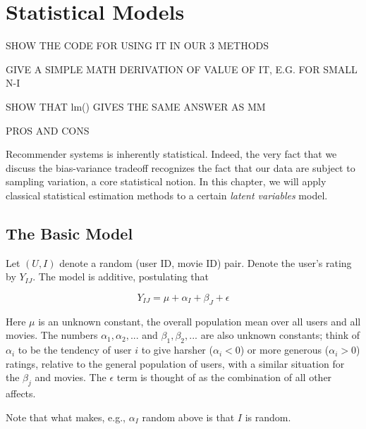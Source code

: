 \chapter{Statistical Models}  
\label{chap:mixed} 

SHOW THE CODE FOR USING IT IN OUR 3 METHODS

GIVE A SIMPLE MATH DERIVATION OF VALUE OF IT, E.G. FOR SMALL N-I

SHOW THAT lm() GIVES THE SAME ANSWER AS MM

PROS AND CONS

Recommender systems is inherently statistical.  Indeed, the very fact
that we discuss the bias-variance tradeoff recognizes the fact that our
data are subject to sampling variation, a core statistical notion.  In
this chapter, we will apply classical statistical estimation methods to
a certain \textit{latent variables} model.

\section{The Basic Model}

Let $(U,I)$ denote a random (user ID, movie ID) pair.  Denote the user's
rating by $Y_{IJ}$.  The model is additive, postulating that

\begin{equation}
Y_{IJ} = \mu + \alpha_I + \beta_J + \epsilon
\end{equation}

Here $\mu$ is an unknown constant, the overall population mean over all
users and all movies.  The numbers $\alpha_1, \alpha_2,...$ and
$\beta_1, \beta_2,...$ are also unknown constants; think of $\alpha_i$
to be the tendency of user $i$ to give harsher ($\alpha_i < 0$) or more
generous ($\alpha_i > 0$) ratings, relative to the general population of
users, with a similar situation for the $\beta_j$ and movies.  The
$\epsilon$ term is thought of as the combination of all other affects.

Note that what makes, e.g., $\alpha_I$ random above is that $I$ is
random.

